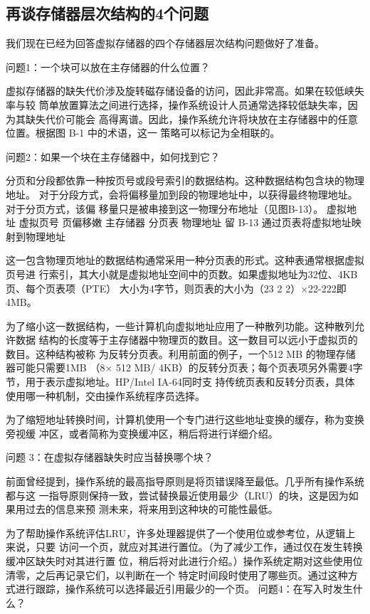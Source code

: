 \subsection{再谈存储器层次结构的4个问题}

我们现在已经为回答虚拟存储器的四个存储器层次结构问题做好了准备。

问题1：一个块可以放在主存储器的什么位置？

虚拟存储器的缺失代价涉及旋转磁存储设备的访问，因此非常高。如果在较低峡失率与较
筒单放置算法之间进行选择，操作系统设计人员通常选择较低缺失率，因为其缺失代价可能会
高得离谱。因此，操作系统允许将块放在主存储器中的任意位置。根据图 B-1 中的术语，这一
策略可以标记为全相联的。

问题2：如果一个块在主存储器中，如何找到它？

分页和分段都依靠一种按页号或段号索引的数据结构。这种数据结构包含块的物理地址。
对于分段方式，会将偏移量加到段的物理地址中，以获得最终物理地址。对于分页方式，该偏
移量只是被串接到这一物理分布地址（见图B-13）。
虚拟地址
虚拟页号
页偏移嫩
主存储器
分页表
物理地址
留 B-13
通过页表将虚拟地址映射到物理地址

这一包含物理页地址的数据结构通常采用一种分页表的形式。这种表通常根据虚拟页号进
行索引，其大小就是虚拟地址空间中的页数。如果虚拟地址为32位、4KB页、每个页表项（PTE）
大小为4字节，则页表的大小为（23 2 2）×22-222即4MB。

为了缩小这一数据结构，一些计算机向虚拟地址应用了一种散列功能。这种散列允许数据
结构的长度等于主存储器中物理页的数目。这一数目可以远小于虚拟页的数目。这种结构被称
为反转分页表。利用前面的例子，一个512 MB 的物理存储器可能只需要1MB （8× 512 MB/
4KB）的反转分页表；每个页表项另外需要4字节，用于表示虚拟地址。HP/Intel IA-64同时支
持传统页表和反转分页表，具体使用哪一种机制，交由操作系统程序员选择。

为了缩短地址转换时间，计算机使用一个专门进行这些地址变换的缓存，称为变换旁视缓
冲区，或者简称为变换缓冲区，稍后将进行详细介绍。

问题 3：在虚拟存储器缺失时应当替换哪个块？

前面曾经提到，操作系统的最高指导原则是将页错误降至最低。几乎所有操作系统都与这
一指导原则保持一致，尝试替换最近使用最少（LRU）的块，这是因为如果用过去的信息来预
测未来，将来用到这种块的可能性最低。

为了帮助操作系统评估LRU，许多处理器提供了一个使用位或参考位，从逻辑上来说，只要
访问一个页，就应对其进行置位。（为了减少工作，通过仅在发生转换缓冲区缺失时对其进行置
位，稍后将对此进行介绍。）操作系统定期对这些使用位清零，之后再记录它们，以判断在一个
特定时间段时使用了哪些页。通过这种方式进行跟踪，操作系统可以选择最近引用最少的一个页。
问题4：在写入时发生什么？

